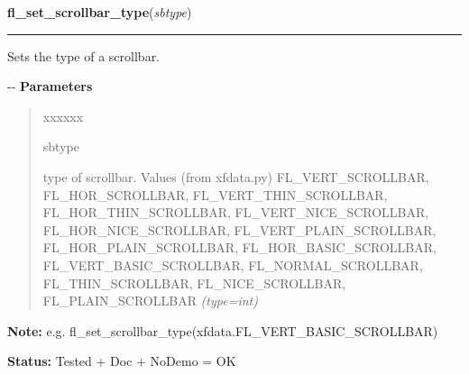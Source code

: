 \hspace{.8\funcindent}\begin{boxedminipage}{\funcwidth}

    \raggedright \textbf{fl\_set\_scrollbar\_type}(\textit{sbtype})

    \vspace{-1.5ex}

    \rule{\textwidth}{0.5\fboxrule}
\setlength{\parskip}{2ex}

Sets the type of a scrollbar.

-{}-
\setlength{\parskip}{1ex}
      \textbf{Parameters}
      \vspace{-1ex}

      \begin{quote}
        \begin{Ventry}{xxxxxx}

          \item[sbtype]


type of scrollbar. Values (from xfdata.py) FL\_VERT\_SCROLLBAR,
FL\_HOR\_SCROLLBAR, FL\_VERT\_THIN\_SCROLLBAR, FL\_HOR\_THIN\_SCROLLBAR,
FL\_VERT\_NICE\_SCROLLBAR, FL\_HOR\_NICE\_SCROLLBAR, FL\_VERT\_PLAIN\_SCROLLBAR,
FL\_HOR\_PLAIN\_SCROLLBAR, FL\_HOR\_BASIC\_SCROLLBAR,
FL\_VERT\_BASIC\_SCROLLBAR, FL\_NORMAL\_SCROLLBAR, FL\_THIN\_SCROLLBAR,
FL\_NICE\_SCROLLBAR, FL\_PLAIN\_SCROLLBAR
            {\it (type=int)}

        \end{Ventry}

      \end{quote}

\textbf{Note:} 
e.g. fl\_set\_scrollbar\_type(xfdata.FL\_VERT\_BASIC\_SCROLLBAR)


\textbf{Status:} 
Tested + Doc + NoDemo = OK


    \end{boxedminipage}

    \label{xformslib:flbasic:fl_set_thinscrollbar}

    \vspace{0.5ex}

